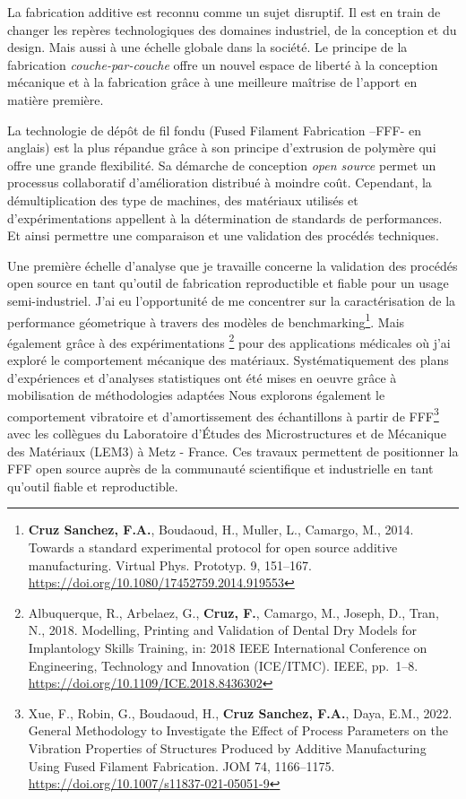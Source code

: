 \documentclass[
  12pt,
  oneside]{book}
\begin{document}
La fabrication additive est reconnu comme un sujet disruptif.
Il est en train de changer les repères technologiques des domaines industriel, de la conception et du design.
Mais aussi à une échelle globale dans la société.
Le principe de la fabrication \emph{couche-par-couche} offre un nouvel espace de liberté à la conception mécanique et à la fabrication grâce à une meilleure maîtrise de l'apport en matière première.

La technologie de dépôt de fil fondu (Fused Filament Fabrication --FFF- en anglais) est la plus répandue grâce à son principe d'extrusion de polymère qui offre une grande flexibilité. Sa démarche de conception \emph{open source} permet un processus collaboratif d'amélioration distribué à moindre coût.
Cependant, la démultiplication des type de machines, des matériaux utilisés et d'expérimentations appellent à la détermination de standards de performances. Et ainsi permettre une comparaison et une validation des procédés techniques.

Une première échelle d'analyse que je travaille concerne la validation des procédés open source en tant qu'outil de fabrication reproductible et fiable pour un usage semi-industriel.
J'ai eu l'opportunité de me concentrer sur la caractérisation de la performance géometrique à travers des modèles de benchmarking\footnote{\textbf{Cruz Sanchez, F.A.}, Boudaoud, H., Muller, L., Camargo, M., 2014. Towards a standard experimental protocol for open source additive manufacturing. Virtual Phys. Prototyp. 9, 151--167. \url{https://doi.org/10.1080/17452759.2014.919553}}.
Mais également grâce à des expérimentations \footnote{Albuquerque, R., Arbelaez, G., \textbf{Cruz, F.}, Camargo, M., Joseph, D., Tran, N., 2018. Modelling, Printing and Validation of Dental Dry Models for Implantology Skills Training, in: 2018 IEEE International Conference on Engineering, Technology and Innovation (ICE/ITMC). IEEE, pp.~1--8. \url{https://doi.org/10.1109/ICE.2018.8436302}} pour des applications médicales où j'ai exploré le comportement mécanique des matériaux.
Systématiquement des plans d'expériences et d'analyses statistiques ont été mises en oeuvre grâce à mobilisation de méthodologies adaptées
Nous explorons également le comportement vibratoire et d'amortissement des échantillons à partir de FFF\footnote{Xue, F., Robin, G., Boudaoud, H., \textbf{Cruz Sanchez, F.A.}, Daya, E.M., 2022. General Methodology to Investigate the Effect of Process Parameters on the Vibration Properties of Structures Produced by Additive Manufacturing Using Fused Filament Fabrication. JOM 74, 1166--1175. \url{https://doi.org/10.1007/s11837-021-05051-9}} avec les collègues du Laboratoire d'Études des Microstructures et de Mécanique des Matériaux (LEM3) à Metz - France.
Ces travaux permettent de positionner la FFF open source auprès de la communauté scientifique et industrielle en tant qu'outil fiable et reproductible.
\end{document}
